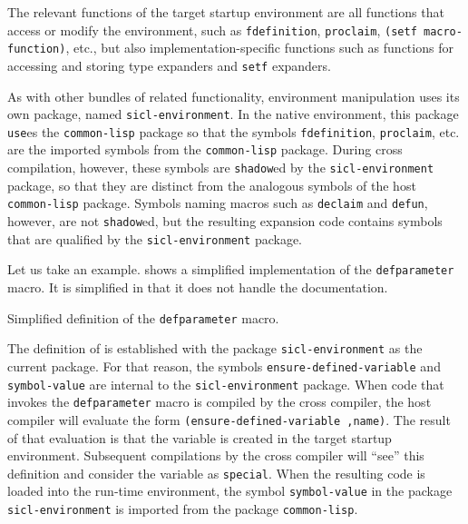 The relevant functions of the target startup environment are all \commonlisp{}
functions that access or modify the environment, such as
\texttt{fdefinition}, \texttt{proclaim}, \texttt{(setf
  macro-function)}, etc., but also implementation-specific functions
such as functions for accessing and storing type expanders and
\texttt{setf} expanders.

As with other bundles of related functionality, environment
manipulation uses its own package, named \texttt{sicl-environment}.
In the native environment, this package \texttt{use}es the
\texttt{common-lisp} package so that the symbols \texttt{fdefinition},
\texttt{proclaim}, etc. are the imported symbols from the
\texttt{common-lisp} package.  During cross compilation, however,
these symbols are \texttt{shadow}ed by the \texttt{sicl-environment}
package, so that they are distinct from the analogous symbols of the
host \texttt{common-lisp} package.  Symbols naming macros such as
\texttt{declaim} and \texttt{defun}, however, are not
\texttt{shadow}ed, but the resulting expansion code contains symbols
that are qualified by the \texttt{sicl-environment} package.  

Let us take an example.   shows a
simplified implementation of the \texttt{defparameter} macro.  It is
simplified in that it does not handle the documentation. 

\begin{codefragment}
\caption{\label{code-defparameter}
Simplified definition of the \texttt{defparameter} macro.}
\end{codefragment}

The definition of  is established with the
package \texttt{sicl-environment} as the current package.  For that
reason, the symbols \texttt{ensure-defined-variable} and
\texttt{symbol-value} are internal to the \texttt{sicl-environment}
package.  When code that invokes the \texttt{defparameter} macro is
compiled by the cross compiler, the host compiler will evaluate the
form \texttt{(ensure-defined-variable ,name)}.  The result of that
evaluation is that the variable is created in the target startup
environment.  Subsequent compilations by the cross compiler will
``see'' this definition and consider the variable as \texttt{special}.
When the resulting code is loaded into the run-time environment, the
symbol \texttt{symbol-value} in the package \texttt{sicl-environment}
is imported from the package \texttt{common-lisp}.

